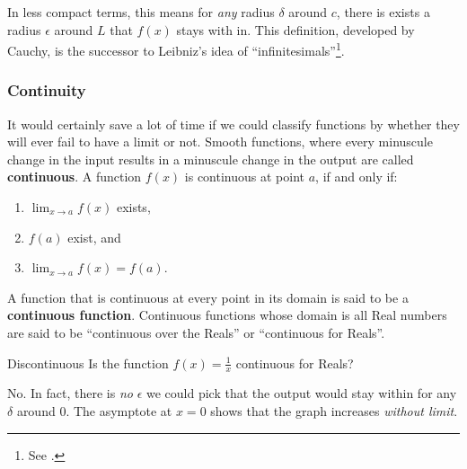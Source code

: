 In less compact terms, this means for \emph{any} radius $\delta$ around $c$, there is exists
a radius $\epsilon$ around $L$ that $f(x)$ stays with in.  This definition, developed by
Cauchy, is the successor to Leibniz's idea of ``infinitesimals''\footnote{
See \cite{Alexander12}.}.


\subsubsection{Continuity}
It would certainly save a lot of time if we could classify functions by whether they will
ever fail to have a limit or not.  Smooth functions, where every minuscule change in the
input results in a minuscule change in the output are called \textbf{continuous}.  A function
$f(x)$ is continuous at point $a$, if and only if:
\begin{enumerate}
\item $\displaystyle \lim_{x\rightarrow a} f(x)$ exists,
\item $f(a)$ exist, and
\item $\displaystyle \lim_{x\rightarrow a} f(x) = f(a)$.
\end{enumerate}
A function that is continuous at every point in its domain is said to be a \textbf{continuous
function}.  Continuous functions whose domain is all Real numbers are said to be ``continuous
over the Reals'' or ``continuous for Reals''.


\begin{example}{Discontinuous}
	\exProblem
Is the function $f(x)=\frac{1}{x}$ continuous for Reals?

	\exSolution
No.  In fact, there is \emph{no} $\epsilon$ we could pick that the
output would stay within for any $\delta$ around 0.  The asymptote at $x=0$ shows that the
graph increases \emph{without limit}.


\end{example}



